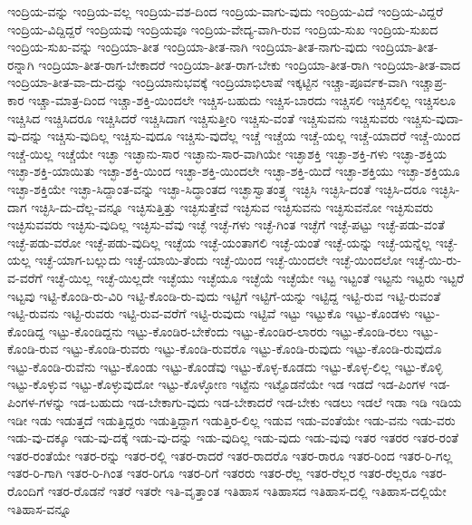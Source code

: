 {ಇಂದ್ರಿಯ-ವನ್ನು
ಇಂದ್ರಿಯ-ವಲ್ಲ
ಇಂದ್ರಿಯ-ವಶ-ದಿಂದ
ಇಂದ್ರಿಯ-ವಾಗು-ವುದು
ಇಂದ್ರಿಯ-ವಿದೆ
ಇಂದ್ರಿಯ-ವಿದ್ದರೆ
ಇಂದ್ರಿಯ-ವಿದ್ದಿದ್ದರೆ
ಇಂದ್ರಿಯವು
ಇಂದ್ರಿಯವೂ
ಇಂದ್ರಿಯ-ವೇದ್ಯ-ವಾಗಿ-ರುವ
ಇಂದ್ರಿಯ-ಸುಖ
ಇಂದ್ರಿಯ-ಸುಖದ
ಇಂದ್ರಿಯ-ಸುಖ-ವನ್ನು
ಇಂದ್ರಿಯಾ-ತೀತ
ಇಂದ್ರಿಯಾ-ತೀತ-ನಾಗಿ
ಇಂದ್ರಿಯಾ-ತೀತ-ನಾಗು-ವುದು
ಇಂದ್ರಿಯಾ-ತೀತ-ರನ್ನಾಗಿ
ಇಂದ್ರಿಯಾ-ತೀತ-ರಾಗ-ಬೇಕಾದರೆ
ಇಂದ್ರಿಯಾ-ತೀತ-ರಾಗ-ಬೇಕು
ಇಂದ್ರಿಯಾ-ತೀತ-ರಾಗಿ
ಇಂದ್ರಿಯಾ-ತೀತ-ವಾದ
ಇಂದ್ರಿಯಾ-ತೀತ-ವಾ-ದು-ದನ್ನು
ಇಂದ್ರಿಯಾನುಭವಕ್ಕೆ
ಇಂದ್ರಿಯಾಭಿಲಾಷೆ
ಇಕ್ಕಟ್ಟಿನ
ಇಚ್ಚಾ-ಪೂರ್ವಕ-ವಾಗಿ
ಇಚ್ಚಾಪ್ರ-ಕಾರ
ಇಚ್ಚಾ-ಮಾತ್ರ-ದಿಂದ
ಇಚ್ಚಾ-ಶಕ್ತಿ-ಯಿಂದಲೇ
ಇಚ್ಚಿಸ-ಬಹುದು
ಇಚ್ಚಿಸ-ಬಾರದು
ಇಚ್ಚಿಸಲಿ
ಇಚ್ಚಿಸಲಿಲ್ಲ
ಇಚ್ಚಿಸಲೂ
ಇಚ್ಚಿಸಿದ
ಇಚ್ಚಿಸಿದರೂ
ಇಚ್ಚಿಸಿದರೆ
ಇಚ್ಚಿಸಿದಾಗ
ಇಚ್ಚಿಸುತ್ತೀರಿ
ಇಚ್ಚಿಸು-ವಂತೆ
ಇಚ್ಚಿಸುವನು
ಇಚ್ಚಿಸುವರು
ಇಚ್ಚಿಸು-ವುದಾ-ವು-ದನ್ನು
ಇಚ್ಚಿಸು-ವುದಿಲ್ಲ
ಇಚ್ಚಿಸು-ವುದೂ
ಇಚ್ಚಿಸು-ವುದೆಲ್ಲ
ಇಚ್ಚೆ
ಇಚ್ಚೆಯ
ಇಚ್ಚೆ-ಯಲ್ಲ
ಇಚ್ಚೆ-ಯಾದರೆ
ಇಚ್ಚೆ-ಯಿಂದ
ಇಚ್ಚೆ-ಯಿಲ್ಲ
ಇಚ್ಚೆಯೇ
ಇಚ್ಛಾ
ಇಚ್ಛಾನು-ಸಾರ
ಇಚ್ಛಾನು-ಸಾರ-ವಾಗಿಯೇ
ಇಚ್ಛಾಶಕ್ತಿ
ಇಚ್ಛಾ-ಶಕ್ತಿ-ಗಳು
ಇಚ್ಛಾ-ಶಕ್ತಿಯ
ಇಚ್ಛಾ-ಶಕ್ತಿ-ಯಾಯಿತು
ಇಚ್ಛಾ-ಶಕ್ತಿ-ಯಿಂದ
ಇಚ್ಛಾ-ಶಕ್ತಿ-ಯಿಂದಲೇ
ಇಚ್ಛಾ-ಶಕ್ತಿ-ಯಿದೆ
ಇಚ್ಛಾ-ಶಕ್ತಿಯು
ಇಚ್ಛಾ-ಶಕ್ತಿಯೂ
ಇಚ್ಛಾ-ಶಕ್ತಿಯೇ
ಇಚ್ಛಾ-ಸಿದ್ದಾಂತ-ವನ್ನು
ಇಚ್ಛಾ-ಸಿದ್ಧಾಂತದ
ಇಚ್ಛಾಸ್ವಾತಂತ್ರ್ಯ
ಇಚ್ಛಿಸಿ
ಇಚ್ಛಿಸಿ-ದಂತೆ
ಇಚ್ಛಿಸಿ-ದರೂ
ಇಚ್ಛಿಸಿ-ದಾಗ
ಇಚ್ಛಿಸಿ-ದು-ದೆಲ್ಲ-ವನ್ನೂ
ಇಚ್ಛಿಸುತ್ತಿತ್ತು
ಇಚ್ಛಿಸುತ್ತೇವೆ
ಇಚ್ಛಿಸುವ
ಇಚ್ಛಿಸುವನು
ಇಚ್ಛಿಸುವನೋ
ಇಚ್ಛಿಸುವರು
ಇಚ್ಛಿಸುವವರು
ಇಚ್ಛಿಸು-ವುದಿಲ್ಲ
ಇಚ್ಛಿಸು-ವೆವು
ಇಚ್ಛೆ
ಇಚ್ಛೆ-ಗಳು
ಇಚ್ಛೆ-ಗಿಂತ
ಇಚ್ಛೆಗೆ
ಇಚ್ಛೆ-ಪಟ್ಟು
ಇಚ್ಛೆ-ಪಡು-ವಂತೆ
ಇಚ್ಛೆ-ಪಡು-ವರೋ
ಇಚ್ಛೆ-ಪಡು-ವುದಿಲ್ಲ
ಇಚ್ಛೆಯ
ಇಚ್ಛೆ-ಯಂತಾಗಲಿ
ಇಚ್ಛೆ-ಯಂತೆ
ಇಚ್ಛೆ-ಯನ್ನು
ಇಚ್ಛೆ-ಯನ್ನೆಲ್ಲ
ಇಚ್ಛೆ-ಯಲ್ಲ
ಇಚ್ಛೆ-ಯಾಗ-ಬಲ್ಲುದು
ಇಚ್ಛೆ-ಯಾಯಿ-ತೆಂದು
ಇಚ್ಛೆ-ಯಿಂದ
ಇಚ್ಛೆ-ಯಿಂದಲೇ
ಇಚ್ಛೆ-ಯಿಂದಲೋ
ಇಚ್ಛೆ-ಯಿ-ರು-ವ-ವರೆಗೆ
ಇಚ್ಛೆ-ಯಿಲ್ಲ
ಇಚ್ಛೆ-ಯಿಲ್ಲದೇ
ಇಚ್ಛೆಯು
ಇಚ್ಛೆಯೂ
ಇಚ್ಛೆಯೆ
ಇಚ್ಛೆಯೇ
ಇಟ್ಟ
ಇಟ್ಟಂತೆ
ಇಟ್ಟನು
ಇಟ್ಟರು
ಇಟ್ಟರೆ
ಇಟ್ಟವು
ಇಟ್ಟಿ-ಕೊಂಡಿ-ರು-ವಿರಿ
ಇಟ್ಟಿ-ಕೊಂಡಿ-ರು-ವುದು
ಇಟ್ಟಿಗೆ
ಇಟ್ಟಿಗೆ-ಯನ್ನು
ಇಟ್ಟಿದ್ದ
ಇಟ್ಟಿ-ರುವ
ಇಟ್ಟಿ-ರುವಂತೆ
ಇಟ್ಟಿ-ರುವನು
ಇಟ್ಟಿ-ರುವರು
ಇಟ್ಟಿ-ರುವ-ವರೆಗೆ
ಇಟ್ಟಿ-ರುವುದು
ಇಟ್ಟಿವೆ
ಇಟ್ಟು
ಇಟ್ಟುಕೊ
ಇಟ್ಟು-ಕೊಂಡಳು
ಇಟ್ಟು-ಕೊಂಡಿದ್ದ
ಇಟ್ಟು-ಕೊಂಡಿದ್ದನು
ಇಟ್ಟು-ಕೊಂಡಿರ-ಬೇಕೆಂದು
ಇಟ್ಟು-ಕೊಂಡಿರ-ಲಾರರು
ಇಟ್ಟು-ಕೊಂಡಿ-ರಲು
ಇಟ್ಟು-ಕೊಂಡಿ-ರುವ
ಇಟ್ಟು-ಕೊಂಡಿ-ರುವರು
ಇಟ್ಟು-ಕೊಂಡಿ-ರುವರೊ
ಇಟ್ಟು-ಕೊಂಡಿ-ರುವುದು
ಇಟ್ಟು-ಕೊಂಡಿ-ರುವುದೊ
ಇಟ್ಟು-ಕೊಂಡಿ-ರುವೆನು
ಇಟ್ಟು-ಕೊಂಡು
ಇಟ್ಟು-ಕೊಂಡೆವು
ಇಟ್ಟು-ಕೊಳ್ಳ-ಕೂಡದು
ಇಟ್ಟು-ಕೊಳ್ಳ-ಲಿಲ್ಲ
ಇಟ್ಟು-ಕೊಳ್ಳಿ
ಇಟ್ಟು-ಕೊಳ್ಳುವ
ಇಟ್ಟು-ಕೊಳ್ಳುವುದೋ
ಇಟ್ಟು-ಕೊಳ್ಳೋಣ
ಇಟ್ಟೆನು
ಇಟ್ಟೊಡನೆಯೇ
ಇಡ
ಇಡದೆ
ಇಡ-ಪಿಂಗಳ
ಇಡ-ಪಿಂಗಳ-ಗಳನ್ನು
ಇಡ-ಬಹುದು
ಇಡ-ಬೇಕಾಗು-ವುದು
ಇಡ-ಬೇಕಾದರೆ
ಇಡ-ಬೇಕು
ಇಡಲು
ಇಡಲೆ
ಇಡಾ
ಇಡಿ
ಇಡಿಯ
ಇಡೀ
ಇಡು
ಇಡುತ್ತದೆ
ಇಡುತ್ತಿದ್ದರು
ಇಡುತ್ತಿದ್ದಾಗ
ಇಡುತ್ತಿರ-ಲಿಲ್ಲ
ಇಡುವ
ಇಡು-ವಂತೆಯೇ
ಇಡು-ವನು
ಇಡು-ವರು
ಇಡು-ವು-ದಕ್ಕೂ
ಇಡು-ವು-ದಕ್ಕೆ
ಇಡು-ವು-ದನ್ನು
ಇಡು-ವುದಿಲ್ಲ
ಇಡು-ವುದು
ಇಡು-ವುವು
ಇತರ
ಇತರರ
ಇತರ-ರಂತೆ
ಇತರ-ರಂತೆಯೇ
ಇತರ-ರನ್ನು
ಇತರ-ರಲ್ಲಿ
ಇತರ-ರಾದರೆ
ಇತರ-ರಾದರೊ
ಇತರ-ರಾರೂ
ಇತರ-ರಿಂದ
ಇತರ-ರಿ-ಗಲ್ಲ
ಇತರ-ರಿ-ಗಾಗಿ
ಇತರ-ರಿ-ಗಿಂತ
ಇತರ-ರಿಗೂ
ಇತರ-ರಿಗೆ
ಇತರರು
ಇತರ-ರೆಲ್ಲ
ಇತರ-ರೆಲ್ಲರ
ಇತರ-ರೆಲ್ಲರೂ
ಇತರ-ರೊಂದಿಗೆ
ಇತರ-ರೊಡನೆ
ಇತರೆ
ಇತರೇ
ಇತಿ-ವೃತ್ತಾಂತ
ಇತಿಹಾಸ
ಇತಿಹಾಸದ
ಇತಿಹಾಸ-ದಲ್ಲಿ
ಇತಿಹಾಸ-ದಲ್ಲಿಯೇ
ಇತಿಹಾಸ-ವನ್ನೂ
}
